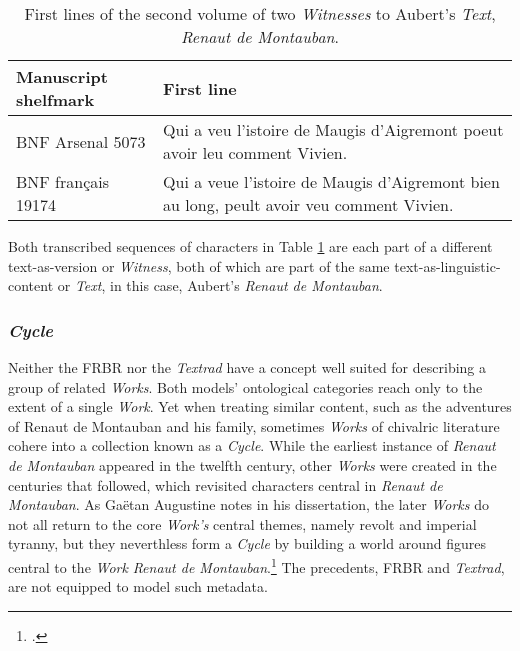 \begin{table}[ht]
    \begin{center}
        \begin{tabular}{|p{}|p{}|}
            \hline
            Manuscript shelfmark & First line \\
            \hline \hline
            BNF Arsenal 5073 & Qui a veu l'istoire de Maugis d'Aigremont poeut avoir leu comment Vivien. \\
            \hline
            BNF français 19174 & Qui a veue l'istoire de Maugis d'Aigremont bien au long, peult avoir veu comment Vivien.\\
            \hline
        \end{tabular}
    \end{center}
\caption{First lines of the second volume of two \textit{Witnesses} to Aubert's \textit{Text}, \textit{Renaut de Montauban}.}
\label{tab:TextVersions}
\end{table}

\noindent Both transcribed sequences of characters in Table \ref{tab:TextVersions} are each part of a different text-as-version or \textit{Witness}, both of which are part of the same text-as-linguistic-content or \textit{Text}, in this case, Aubert's \textit{Renaut de Montauban}.

\subsubsection{\textit{Cycle}}

Neither the FRBR nor the \textit{Textrad} have a concept well suited for describing a group of related \textit{Works}. Both models' ontological categories reach only to the extent of a single \textit{Work}. Yet when treating similar content, such as the adventures of Renaut de Montauban and his family, sometimes \textit{Works} of chivalric literature cohere into a collection known as a \textit{Cycle}. While the earliest instance of \textit{Renaut de Montauban} appeared in the twelfth century, other \textit{Works} were created in the centuries that followed, which revisited characters central in \textit{Renaut de Montauban}. As Gaëtan Augustine notes in his dissertation, the later \textit{Works} do not all return to the core \textit{Work's} central themes, namely revolt and imperial tyranny, but they neverthless form a \textit{Cycle} by building a world around figures central to the \textit{Work} \textit{Renaut de Montauban}.\footcite[][]{Augustine2020} The precedents, FRBR and \textit{Textrad}, are not equipped to model such metadata.

